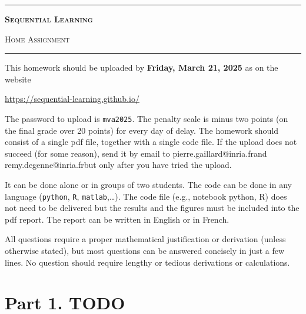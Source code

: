 \documentclass[11pt]{exam}
\makeatletter
\newcommand{\thiscoursecode}{Sequential Learning}
\newcommand{\examname}{Home Assignment}
\newcommand{\email}{pierre.gaillard@inria.fr}
\newcommand{\emailremy}{remy.degenne@inria.fr}
\newcommand{\notefront}{
\begin{center}

\hrule \vspace*{20pt}
\textbf{\huge{\textsc{\thiscoursecode}}}{\huge \par} 

\smallskip
{\large{\textsc{\examname}}}\\ \vspace{20pt}

\hrule \vspace*{20pt}

  \end{center}
  }
\makeatother
\begin{document}
  \notefront


This homework should be uploaded by {\bfseries Friday, March 21, 2025} as on the website
\begin{center}
	\url{https://sequential-learning.github.io/}
\end{center}
The password to upload is \texttt{mva2025}. The penalty scale is minus two points (on the final grade over 20 points) for every day of delay.
The homework should consist of a single pdf file, together with a single code file. If the upload does not succeed (for some reason), send it by email to \email and \emailremy but only after you have tried the upload.

It can be done alone or in groups of two students. The code can be done in any language (\texttt{python}, \texttt{R}, \texttt{matlab},\dots).
The code file (e.g., notebook python, R) does not need to be delivered but the results and the figures must be included into the pdf report. The report can be written in English or in French. 

\medskip
All questions require a proper mathematical justification or derivation (unless otherwise stated), but most questions can be answered concisely in just a few lines. No question should require lengthy or tedious derivations or calculations.



\section*{Part 1. TODO}



\end{document}
